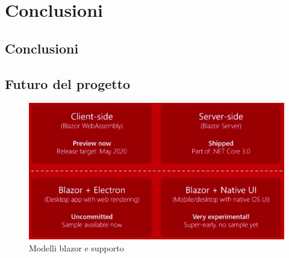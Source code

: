 \chapter{Conclusioni}\label{cap:conclusioni}
\section{Conclusioni}\label{sez:conclusioni}
\section{Futuro del progetto}\label{sez:futuro}
\begin{figure}[H]
	\centerline{\includegraphics[scale=0.8]{figure/ModelsSupportedOrNot.png}}
	\caption{Modelli blazor e supporto}
	\label{fig:supportedBlazorModels}
\end{figure}